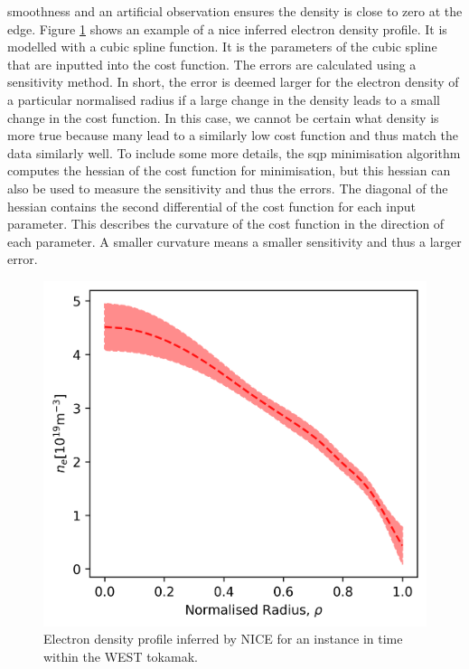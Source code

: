 smoothness and an artificial observation ensures the density is close to zero at the edge. Figure \ref{fig:nice_example} shows an example of a \gls{nice} inferred electron density profile. It is modelled with a cubic spline function. It is the parameters of the cubic spline that are inputted into the cost function. The errors are calculated using a sensitivity method. In short, the error is deemed larger for the electron density of a particular normalised radius if a large change in the density leads to a small change in the cost function. In this case, we cannot be certain what density is more true because many lead to a similarly low cost function and thus match the data similarly well. To include some more details, the \gls{sqp} minimisation algorithm computes the hessian of the cost function for minimisation, but this hessian can also be used to measure the sensitivity and thus the errors. The diagonal of the hessian contains the second differential of the cost function for each input parameter. This describes the curvature of the cost function in the direction of each parameter. A smaller curvature means a smaller sensitivity and thus a larger error.

\begin{figure}
  \centering
  \includegraphics[width=13cm]{images/niceExample.png}
  \caption{Electron density profile inferred by NICE for an instance in time within the WEST tokamak.}
  \label{fig:nice_example}
\end{figure}

